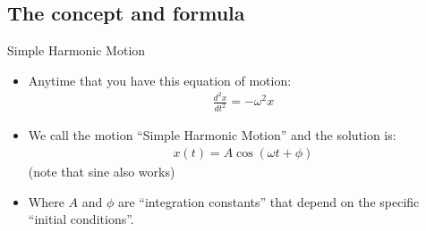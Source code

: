 \documentclass[aspectratio=169,
hyperref={colorlinks,urlcolor=blue}
]{beamer}
\begin{document}
\begin{frame}
\titlepage
\thispagestyle{empty}
\end{frame}










\subsection{The concept and formula}
\label{subsec:conceptandformulashm}
\begin{frame}{Simple Harmonic Motion}
\begin{itemize}
\item Anytime that you have this equation of motion:
\begin{align*}
\frac{d^2x}{dt^2}=-\omega^2 x
\end{align*}
\item We call the motion ``Simple Harmonic Motion'' and the solution is:
\begin{align*}
x(t)=A\cos(\omega t +\phi)
\end{align*}
(note that sine also works)
\item Where $A$ and $\phi$ are ``integration constants'' that depend on the specific ``initial conditions''.
\end{itemize}

\end{frame}



\end{document}

